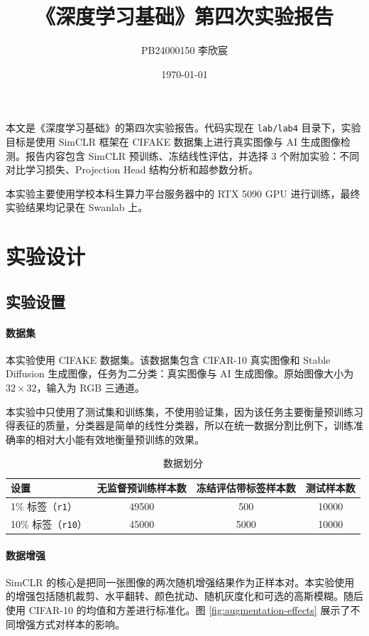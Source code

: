 \documentclass{ctexart}
\title{《深度学习基础》第四次实验报告}
\author{PB24000150 李欣宸}
\date{\today}
\begin{document}
\maketitle

本文是《深度学习基础》的第四次实验报告。代码实现在 \verb|lab/lab4| 目录下，实验目标是使用 SimCLR 框架在 CIFAKE 数据集上进行真实图像与 AI 生成图像检测。报告内容包含 SimCLR 预训练、冻结线性评估，并选择 3 个附加实验：不同对比学习损失、Projection Head 结构分析和超参数分析。

本实验主要使用学校本科生算力平台服务器中的 RTX 5090 GPU 进行训练，最终实验结果均记录在 Swanlab 上。

\section{实验设计}

\subsection{实验设置}

\paragraph{数据集}
本实验使用 CIFAKE 数据集。该数据集包含 CIFAR-10 真实图像和 Stable Diffusion 生成图像，任务为二分类：真实图像与 AI 生成图像。原始图像大小为 $32\times 32$，输入为 RGB 三通道。

本实验中只使用了测试集和训练集，不使用验证集，因为该任务主要衡量预训练习得表征的质量，分类器是简单的线性分类器，所以在统一数据分割比例下，训练准确率的相对大小能有效地衡量预训练的效果。

\begin{table}[htbp]
    \centering
    \begin{tabular}{lccc}
        \toprule
        设置 & 无监督预训练样本数 & 冻结评估带标签样本数 & 测试样本数 \\
        \midrule
        1\% 标签（\verb|r1|） & 49500 & 500 & 10000 \\
        10\% 标签（\verb|r10|） & 45000 & 5000 & 10000 \\
        \bottomrule
    \end{tabular}
    \caption{数据划分}
    \label{tab:data-split}
\end{table}

\paragraph{数据增强}
SimCLR 的核心是把同一张图像的两次随机增强结果作为正样本对。本实验使用的增强包括随机裁剪、水平翻转、颜色扰动、随机灰度化和可选的高斯模糊。随后使用 CIFAR-10 的均值和方差进行标准化。图 \ref{fig:augmentation-effects} 展示了不同增强方式对样本的影响。
\end{document}

